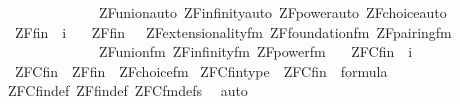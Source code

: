 \begin{isabellebody}
\ \ \ \ \ \ \ \ \ \ \ \ \ \ ZF{\isacharunderscore}{\kern0pt}union{\isacharunderscore}{\kern0pt}auto\ ZF{\isacharunderscore}{\kern0pt}infinity{\isacharunderscore}{\kern0pt}auto\ ZF{\isacharunderscore}{\kern0pt}power{\isacharunderscore}{\kern0pt}auto\ ZF{\isacharunderscore}{\kern0pt}choice{\isacharunderscore}{\kern0pt}auto\isanewline
\isanewline
{}\isamarkupfalse%
\isanewline
\ \ ZF{\isacharunderscore}{\kern0pt}fin\ {\isacharcolon}{\kern0pt}{\isacharcolon}{\kern0pt}\ {\isachardoublequoteopen}i{\isachardoublequoteclose}\ \isanewline
\ \ {\isachardoublequoteopen}ZF{\isacharunderscore}{\kern0pt}fin\ {\isasymequiv}\ {\isacharbraceleft}{\kern0pt}\ ZF{\isacharunderscore}{\kern0pt}extensionality{\isacharunderscore}{\kern0pt}fm{\isacharcomma}{\kern0pt}\ ZF{\isacharunderscore}{\kern0pt}foundation{\isacharunderscore}{\kern0pt}fm{\isacharcomma}{\kern0pt}\ ZF{\isacharunderscore}{\kern0pt}pairing{\isacharunderscore}{\kern0pt}fm{\isacharcomma}{\kern0pt}\isanewline
\ \ \ \ \ \ \ \ \ \ \ \ \ \ ZF{\isacharunderscore}{\kern0pt}union{\isacharunderscore}{\kern0pt}fm{\isacharcomma}{\kern0pt}\ ZF{\isacharunderscore}{\kern0pt}infinity{\isacharunderscore}{\kern0pt}fm{\isacharcomma}{\kern0pt}\ ZF{\isacharunderscore}{\kern0pt}power{\isacharunderscore}{\kern0pt}fm\ {\isacharbraceright}{\kern0pt}{\isachardoublequoteclose}\isanewline
\isanewline
{}\isamarkupfalse%
\isanewline
\ \ ZFC{\isacharunderscore}{\kern0pt}fin\ {\isacharcolon}{\kern0pt}{\isacharcolon}{\kern0pt}\ {\isachardoublequoteopen}i{\isachardoublequoteclose}\ \isanewline
\ \ {\isachardoublequoteopen}ZFC{\isacharunderscore}{\kern0pt}fin\ {\isasymequiv}\ ZF{\isacharunderscore}{\kern0pt}fin\ {\isasymunion}\ {\isacharbraceleft}{\kern0pt}ZF{\isacharunderscore}{\kern0pt}choice{\isacharunderscore}{\kern0pt}fm{\isacharbraceright}{\kern0pt}{\isachardoublequoteclose}\isanewline
\isanewline
{}\isamarkupfalse%
\ ZFC{\isacharunderscore}{\kern0pt}fin{\isacharunderscore}{\kern0pt}type\ {\isacharcolon}{\kern0pt}\ {\isachardoublequoteopen}ZFC{\isacharunderscore}{\kern0pt}fin\ {\isasymsubseteq}\ formula{\isachardoublequoteclose}\isanewline
%
\isadelimproof
\ \ %
\endisadelimproof
%
\isatagproof
{}\isamarkupfalse%
\ ZFC{\isacharunderscore}{\kern0pt}fin{\isacharunderscore}{\kern0pt}def\ ZF{\isacharunderscore}{\kern0pt}fin{\isacharunderscore}{\kern0pt}def\ ZFC{\isacharunderscore}{\kern0pt}fm{\isacharunderscore}{\kern0pt}defs\ \isamarkupfalse%
\ {\isacharparenleft}{\kern0pt}auto{\isacharparenright}{\kern0pt}%
\endisatagproof

\end{isabellebody}
